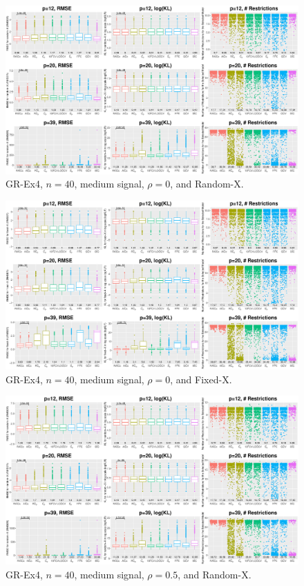 \clearpage
\begin{figure}[!ht]
\centering
\includegraphics[width=\textwidth]{figures/supplement/randomx_GR-Ex4_n40_msnr_rho0.eps}
\caption{GR-Ex4, $n=40$, medium signal, $\rho=0$, and Random-X.}
\end{figure}
\begin{figure}[!ht]
\centering
\includegraphics[width=\textwidth]{figures/supplement/fixedx_GR-Ex4_n40_msnr_rho0.eps}
\caption{GR-Ex4, $n=40$, medium signal, $\rho=0$, and Fixed-X.}
\end{figure}
\clearpage
\begin{figure}[!ht]
\centering
\includegraphics[width=\textwidth]{figures/supplement/randomx_GR-Ex4_n40_msnr_rho05.eps}
\caption{GR-Ex4, $n=40$, medium signal, $\rho=0.5$, and Random-X.}
\end{figure}
